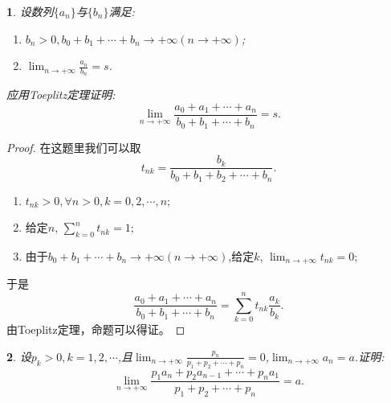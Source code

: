 \documentclass[utf8]{book}
\newtheorem{example}{}[section]             %
\begin{document}
\begin{example}
设数列$\{a_n\}$与$\{b_n\}$满足:
\renewcommand\labelenumi{\normalfont(\theenumi)}
\begin{enumerate}
\item $b_n>0, b_0+b_1+\cdots+b_n\rightarrow +\infty(n\rightarrow+\infty)$;
\item $\displaystyle\lim_{n\to +\infty}\frac{a_n}{b_n}=s$.
\end{enumerate}
应用Toeplitz定理证明:
$$\displaystyle\lim_{n\to +\infty}\frac{a_0+a_1+\cdots+a_n}{b_0+b_1+\cdots+b_n}=s.$$
\end{example}
\begin{proof}
在这题里我们可以取$$t_{nk} = \displaystyle\frac{b_k}{b_0+b_1+b_2+\cdots+b_n}.$$ 
\renewcommand\labelenumi{\normalfont(\theenumi)}
\begin{enumerate}
\item $t_{nk} > 0, \forall n > 0, k=0,2,\cdots,n$;
\item 给定$n$, $\displaystyle\sum_{k=0}^{n}t_{nk} = 1$;
\item 由于$b_0+b_1+\cdots+b_n\rightarrow +\infty(n\rightarrow+\infty)$,给定$k$, $\displaystyle\lim_{n\to +\infty}t_{nk} = 0$;
\end{enumerate}

于是
$$\frac{a_0+a_1+\cdots+a_n}{b_0+b_1+\cdots+b_n}=\displaystyle\sum_{k=0}^{n}t_{nk}\frac{a_k}{b_k}.$$
由Toeplitz定理，命题可以得证。
\end{proof}
\begin{example}
设$p_k>0, k=1,2,\cdots$,且$\displaystyle\lim_{n\to +\infty}\frac{p_n}{p_1+p_2+\cdots+p_n}=0$,$\displaystyle\lim_{n\to +\infty}a_n=a$.证明:
$$\displaystyle\lim_{n\to +\infty}\frac{p_1a_n+p_2a_{n-1}+\cdots+p_na_1}{p_1+p_2+\cdots+p_n}=a.$$
\end{example}
\end{document}
